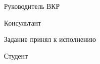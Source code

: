 \intervalS%

Руководитель ВКР \uline{\hspace*{0.1\textheight}}\Supervisor


\intervalS%

Консультант \uline{\hspace*{0.1\textheight}}\ConsultantExtra


\intervalS%


Задание принял к исполнению \thesisStartDate

\intervalS%

Студент \uline{\hspace*{0.1\textheight}}\Author



